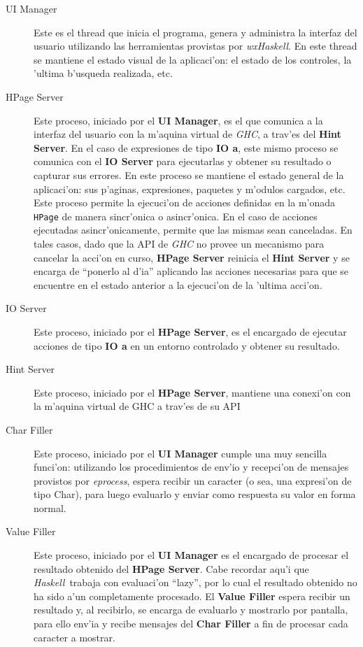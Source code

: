 \documentclass[a4paper]{article}
\newcommand{\haskell}{\textsl{Haskell}}
\begin{document}
\begin{description}
	\item[UI Manager] Este es el thread que inicia el programa, genera y administra la interfaz del usuario utilizando las herramientas provistas por \textsl{wxHaskell}.  En este thread se mantiene el estado visual de la aplicaci'on: el estado de los controles, la 'ultima b'usqueda realizada, etc.
	\item[HPage Server] Este proceso, iniciado por el \textbf{UI Manager}, es el que comunica a la interfaz del usuario con la m'aquina virtual de \textsl{GHC}, a trav'es del \textbf{Hint Server}.  En el caso de expresiones de tipo \textbf{IO a}, este mismo proceso se comunica con el \textbf{IO Server} para ejecutarlas y obtener su resultado o capturar sus errores.  En este proceso se mantiene el estado general de la aplicaci'on: sus p'aginas, expresiones, paquetes y m'odulos cargados, etc.  Este proceso permite la ejecuci'on de acciones definidas en la m'onada \texttt{HPage} de manera sincr'onica o asincr'onica.  En el caso de acciones ejecutadas asincr'onicamente, permite que las mismas sean canceladas.  En tales casos, dado que la API de \textsl{GHC} no provee un mecanismo para cancelar la acci'on en curso, \textbf{HPage Server} reinicia el \textbf{Hint Server} y se encarga de ``ponerlo al d'ia'' aplicando las acciones necesarias para que se encuentre en el estado anterior a la ejecuci'on de la 'ultima acci'on.
	\item[IO Server]Este proceso, iniciado por el  \textbf{HPage Server}, es el encargado de ejecutar acciones de tipo \textbf{IO a} en un entorno controlado y obtener su resultado.
	\item[Hint Server] Este proceso, iniciado por el \textbf{HPage Server}, mantiene una conexi'on con la m'aquina virtual de GHC a trav'es de su API
	\item[Char Filler] Este proceso, iniciado por el \textbf{UI Manager} cumple una muy sencilla funci'on: utilizando los procedimientos de env'io y recepci'on de mensajes provistos por \textsl{eprocess}, espera recibir un caracter (o sea, una expresi'on de tipo Char), para luego evaluarlo y enviar como respuesta su valor en forma normal.
	\item[Value Filler] Este proceso, iniciado por el \textbf{UI Manager} es el encargado de procesar el resultado obtenido del \textbf{HPage Server}.  Cabe recordar aqu'i que \haskell\ trabaja con evaluaci'on ``lazy'', por lo cual el resultado obtenido no ha sido a'un completamente procesado.  El \textbf{Value Filler} espera recibir un resultado y, al recibirlo, se encarga de evaluarlo y mostrarlo por pantalla, para ello env'ia y recibe mensajes del \textbf{Char Filler} a fin de procesar cada caracter a mostrar.

\end{description}
\end{document}
